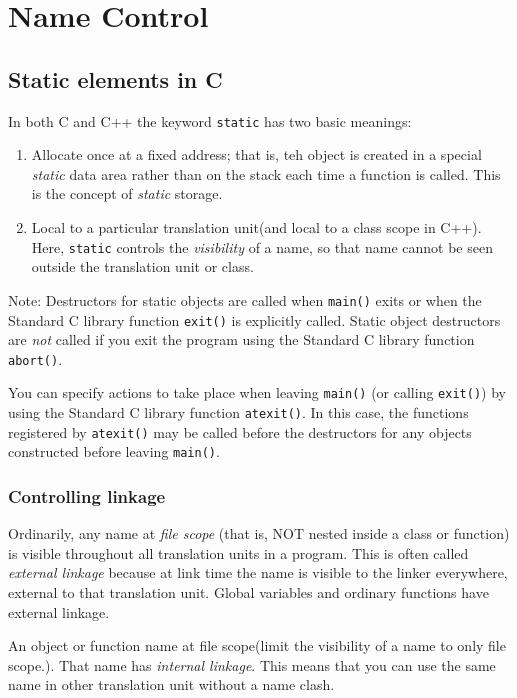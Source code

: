 \documentclass[11pt, a4paper]{book}
\begin{document}
\chapter{Name Control}
\section{Static elements in C}
In both C and C++ the keyword \verb|static| has two basic meanings:
\begin{enumerate}
\item Allocate once at a fixed address; that is, teh object is created in a
special \emph{static} data area rather than on the stack each time a function is
called. This is the concept of \emph{static} storage.
\item Local to a particular translation unit(and local to a class scope in C++).
Here, \verb|static| controls the \emph{visibility} of a name, so that name
cannot be seen outside the translation unit or class.
\end{enumerate}

Note: Destructors for static objects are called when \verb|main()| exits or when
the Standard C library function \verb|exit()| is explicitly called. Static
object destructors are \emph{not} called if you exit the program using the
Standard C library function \verb|abort()|.

You can specify actions to take place when leaving \verb|main()| (or calling
\verb|exit()|) by using the Standard C library function \verb|atexit()|. In this
case, the functions registered by \verb|atexit()| may be called before the
destructors for any objects constructed before leaving \verb|main()|.

\subsection{Controlling linkage}
Ordinarily, any name at \emph{file scope} (that is, NOT nested inside a class or
function) is visible throughout all translation units in a program. This is
often called \emph{external linkage} because at link time the name is visible to
the linker everywhere, external to that translation unit. Global variables and
ordinary functions have external linkage.

An object or function name at file scope(limit the visibility of a name to only
file scope.). That name has \emph{internal linkage}. This means that you can use
the same name in other translation unit without a name clash.
\end{document}
